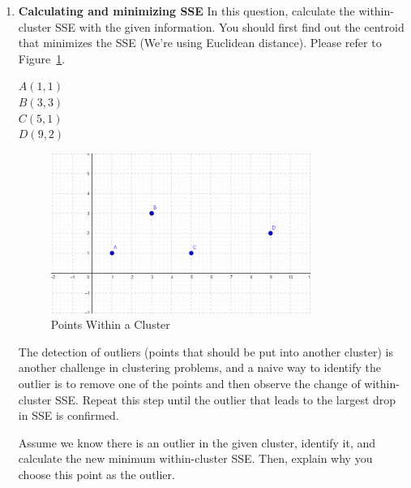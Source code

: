 \documentclass[12pt]{article}
\begin{document}
\begin{enumerate}
    \item \textbf{Calculating and minimizing SSE} 
    In this question, calculate the within-cluster SSE with the given information. You should first find out the centroid that minimizes the SSE (We're using Euclidean distance). Please refer to Figure~\ref{fig:hw2_q1_4}.
    \begin{center}
        $A (1, 1)$ \\
        $B (3, 3) $ \\
        $C (5, 1)$ \\
        $D (9, 2)$
    \end{center}
    \begin{figure}[!h]
        \centering
        \includegraphics[width=0.8\textwidth]{fig/hw2_q1_b.png}
        \caption{Points Within a Cluster}
        \label{fig:hw2_q1_4}
    \end{figure}
    
    The detection of outliers (points that should be put into another cluster) is another challenge in clustering problems, and a naive way to identify the outlier is to remove one of the points and then observe the change of within-cluster SSE. Repeat this step until the outlier that leads to the largest drop in SSE is confirmed.
    
    Assume we know there is an outlier in the given cluster, identify it, and calculate the new minimum within-cluster SSE. Then, explain why you choose this point as the outlier.

\end{enumerate}

\newpage
\end{document}
